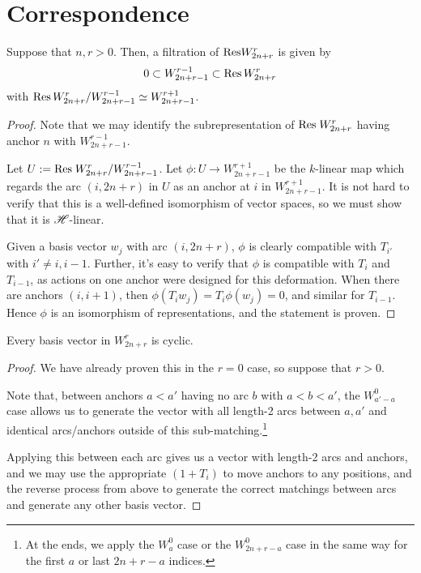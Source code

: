 \documentclass{amsart}
\begin{document}
\section{Correspondence} 
\begin{proposition}
  Suppose that $n,r > 0$.
  Then, a filtration of $\text{Res} W_{2n + r}^r$ is given by
  \begin{equation}
    0 \subset W_{2n + r - 1}^{r-1} \subset \text{Res} \, W_{2n + r}^r \label{Filtration}
  \end{equation}
  with $\text{Res} \, W_{2n + r}^r / W_{2n + r - 1}^{r-1} \simeq W_{2n + r - 1}^{r + 1}$. 
\end{proposition}
\begin{proof}
  Note that we may identify the subrepresentation of $\text{Res} \; W_{2n + r}^r$ having anchor $n$ with $W_{2n + r - 1}^{r-1}$.
  
  Let $U := \text{Res} \; W_{2n + r}^r / W_{2n + r - 1}^{r - 1}$. 
  Let $\phi:U \rightarrow W_{2n + r - 1}^{r + 1}$ be the $k$-linear map which regards the arc $(i,2n + r)$ in $U$ as an anchor at $i$ in $W_{2n + r - 1}^{r + 1}$.
  It is not hard to verify that this is a well-defined isomorphism of vector spaces, so we must show that it is $\mathscr{H}$-linear.

  Given a basis vector $w_j$ with arc $(i,2n + r)$, $\phi$ is clearly compatible with $T_{i'}$ with $i' \neq i,i-1$.
  Further, it's easy to verify that $\phi$ is compatible with $T_{i}$ and $T_{i-1}$, as actions on one anchor were designed for this deformation.
  When there are anchors $(i,i+1)$, then $\phi(T_iw_j) = T_i\phi(w_j) = 0$, and similar for $T_{i -1}$.
  Hence $\phi$ is an isomorphism of representations, and the statement is proven.
\end{proof}

\begin{lemma}
  Every basis vector in $W_{2n + r}^r$ is cyclic.
\end{lemma}
\begin{proof}
  We have already proven this in the $r = 0$ case, so suppose that $r > 0$.

    Note that, between anchors $a<a'$ having no arc $b$ with $a < b < a'$, the $W_{a'-a}^0$ case allows us to generate the vector with all length-2 arcs between $a,a'$ and identical arcs/anchors outside of this sub-matching.\footnote{At the ends, we apply the $W_a^0$ case or the $W_{2n + r - a}^{0}$ case in the same way for the first $a$ or last $2n + r - a$ indices.}

  Applying this between each arc gives us a vector with length-2 arcs and anchors, and we may use the appropriate $(1+T_i)$ to move anchors to any positions, and the reverse process from above to generate the correct matchings between arcs and generate any other basis vector.
\end{proof}
\end{document}
